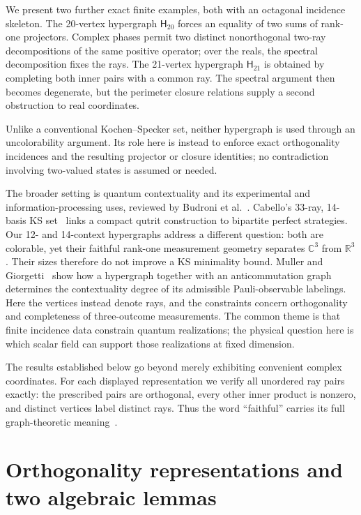 \documentclass[twocolumn,aps,pra,floatfix,amsmath,amssymb,longbibliography]{revtex4-2}
\theoremstyle{definition}
\theoremstyle{remark}
\newcommand{\C}{\mathbb C}
\newcommand{\R}{\mathbb R}
\newcommand{\Htwenty}{\mathsf H_{20}}
\newcommand{\Htwentyone}{\mathsf H_{21}}
\begin{document}
We present two further exact finite examples, both with an octagonal incidence
skeleton.  The 20-vertex hypergraph $\Htwenty$ forces an equality of
two sums of rank-one projectors.  Complex phases permit two distinct
nonorthogonal two-ray decompositions of the same positive operator; over the
reals, the spectral decomposition fixes the rays.  The 21-vertex hypergraph
$\Htwentyone$ is obtained by completing both inner pairs with a common ray.
The spectral argument then becomes degenerate, but the perimeter closure
relations supply a second obstruction to real coordinates.

Unlike a conventional Kochen--Specker set, neither hypergraph is used through
an uncolorability argument.  Its role here is instead to enforce exact
orthogonality incidences and the resulting projector or closure identities;
no contradiction involving two-valued states is assumed or needed.

The broader setting is quantum contextuality and its experimental and
information-processing uses, reviewed by Budroni et al.~\cite{Budroni2022KS}.
Cabello's 33-ray, 14-basis KS set~\cite{Cabello2025SimplestKS} links a compact
qutrit construction to bipartite perfect strategies.  Our 12- and 14-context
hypergraphs address a different question: both are colorable, yet their
faithful rank-one measurement geometry separates $\C^3$ from $\R^3$.
Their sizes therefore do not improve a KS minimality bound.
Muller and Giorgetti~\cite{MullerGiorgetti2025Hypergram} show how a
hypergraph together with an anticommutation graph determines the
contextuality degree of its admissible Pauli-observable labelings.
Here the vertices instead denote rays, and the constraints concern
orthogonality and completeness of three-outcome measurements.  The
common theme is that finite incidence data constrain quantum
realizations; the physical question here is which scalar field can
support those realizations at fixed dimension.

The results established below go beyond merely exhibiting convenient complex
coordinates.  For each displayed representation we verify all unordered ray
pairs exactly: the prescribed pairs are orthogonal, every other inner product
is nonzero, and distinct vertices label distinct rays.  Thus the word
``faithful'' carries its full graph-theoretic meaning~\cite{lovasz-79,Portillo-2015}.

\section{Orthogonality representations and two algebraic lemmas}
\end{document}

